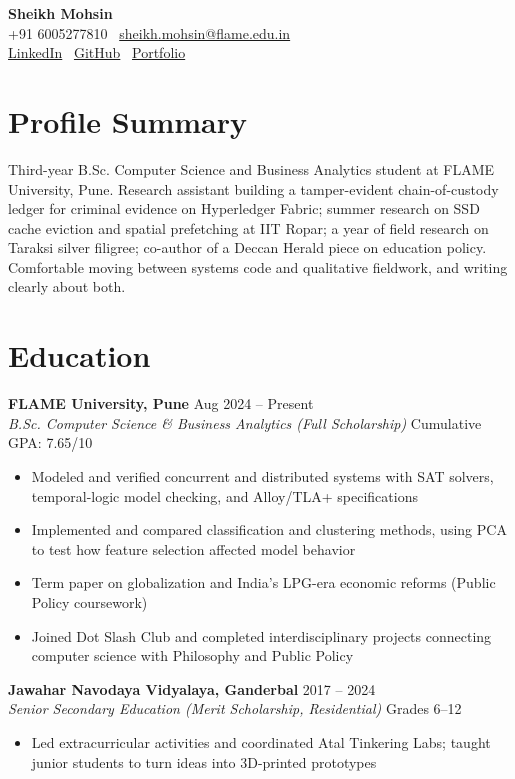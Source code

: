 \documentclass[10pt,a4paper]{article}
\newcommand{\cvheader}[6]{
    \begin{center}
        {\Large\bfseries #1}\\[0.2em]
        #2 \textbullet\ \href{mailto:#3}{#3}\\
        \href{https://linkedin.com/in/#4}{LinkedIn} \textbullet\ \href{https://github.com/#5}{GitHub} \textbullet\ \href{#6}{Portfolio}
    \end{center}
    \vspace{-0.6em}
}
\newcommand{\education}[4]{
    \textbf{#1} \hfill #2\\
    \textit{#3} \hfill #4\\[0.1em]
}
\begin{document}
\small

\cvheader{Sheikh Mohsin}{+91 6005277810}{sheikh.mohsin@flame.edu.in}{sheikh-mohsin-213653254}{notmohsin}{https://sheikhmohsin.vercel.app/}

\section*{Profile Summary}
Third-year B.Sc. Computer Science and Business Analytics student at FLAME University, Pune. Research assistant building a tamper-evident chain-of-custody ledger for criminal evidence on Hyperledger Fabric; summer research on SSD cache eviction and spatial prefetching at IIT Ropar; a year of field research on Taraksi silver filigree; co-author of a Deccan Herald piece on education policy. Comfortable moving between systems code and qualitative fieldwork, and writing clearly about both.

\section*{Education}

\education{FLAME University, Pune}{Aug 2024 -- Present}{B.Sc. Computer Science \& Business Analytics (Full Scholarship)}{Cumulative GPA: 7.65/10}
\begin{itemize}[leftmargin=*, itemsep=0pt, parsep=0pt, topsep=1pt]
    \item Modeled and verified concurrent and distributed systems with SAT solvers, temporal-logic model checking, and Alloy/TLA+ specifications
    \item Implemented and compared classification and clustering methods, using PCA to test how feature selection affected model behavior
    \item Term paper on globalization and India's LPG-era economic reforms (Public Policy coursework)
    \item Joined Dot Slash Club and completed interdisciplinary projects connecting computer science with Philosophy and Public Policy
\end{itemize}

\education{Jawahar Navodaya Vidyalaya, Ganderbal}{2017 -- 2024}{Senior Secondary Education (Merit Scholarship, Residential)}{Grades 6--12}
\begin{itemize}[leftmargin=*, itemsep=0pt, parsep=0pt, topsep=1pt]
    \item Led extracurricular activities and coordinated Atal Tinkering Labs; taught junior students to turn ideas into 3D-printed prototypes
\end{itemize}
\end{document}
